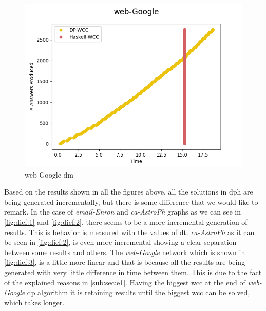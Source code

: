 \documentclass[preprint]{elsarticle}
\begin{document}
\begin{figure}[!htb]
\begin{minipage}{0.33\textwidth}
     \includegraphics[width=1\linewidth, height=0.2\textheight]{web_google}
      \caption{web-Google \acrshort{dm}}
      \label{fig:dief:3}
    \end{minipage}
\end{figure}

Based on the results shown in all the figures above, all the solutions in \acrshort{dph} are being generated incrementally, but there is some difference that we would like to remark. In the case of \emph{email-Enron} and \emph{ca-AstroPh} graphs as we can see in \autoref{fig:dief:1} and \autoref{fig:dief:2}, there seems to be a more incremental generation of results. This is behavior is measured with the values of \acrfull{dt}. \emph{ca-AstroPh} as it can be seen in \autoref{fig:dief:2}, is even more incremental showing a clear separation between some results and others. The \emph{web-Google} network which is shown in \autoref{fig:dief:3}, is a little more linear and that is because all the results are being generated with very little difference in time between them. This is due to the fact of the explained reasons in \autoref{sub:sec:e1}. Having the biggest \acrshort{wcc} at the end of \emph{web-Google} \acrshort{dp} algorithm it is retaining results until the biggest \acrshort{wcc} can be solved, which takes longer. 
\end{document}
